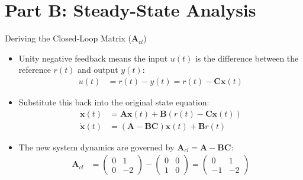 \documentclass{beamer}
\theoremstyle{remark}
\newcommand{\myvec}[1]{\ensuremath{\begin{pmatrix}#1\end{pmatrix}}}
\let\vec\mathbf
\numberwithin{equation}{section}
\begin{document}
\section{Part B: Steady-State Analysis}

\begin{frame}{Deriving the Closed-Loop Matrix ($\vec{A}_{cl}$)}
    \begin{itemize}
        \item Unity negative feedback means the input $u(t)$ is the difference between the reference $r(t)$ and output $y(t)$:
        \begin{align}
            u(t) &= r(t) - y(t) = r(t) - \vec{C}\vec{x}(t)
        \end{align}
        \item Substitute this back into the original state equation:
        \begin{align}
            \dot{\vec{x}}(t) &= \vec{A}\vec{x}(t) + \vec{B}(r(t) - \vec{C}\vec{x}(t)) \\
            \dot{\vec{x}}(t) &= (\vec{A} - \vec{B}\vec{C})\vec{x}(t) + \vec{B}r(t)
        \end{align}
        \item The new system dynamics are governed by $\vec{A}_{cl} = \vec{A} - \vec{B}\vec{C}$:
        \begin{align}
            \vec{A}_{cl} &= \myvec{ 0 & 1 \\ 0 & -2 } - \myvec{ 0 & 0 \\ 1 & 0 } = \myvec{ 0 & 1 \\ -1 & -2 }
        \end{align}
    \end{itemize}
\end{frame}
\end{document}

